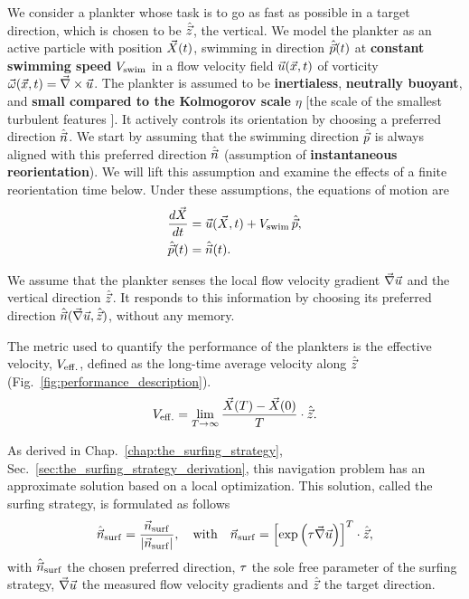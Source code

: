 We consider a plankter whose task is to go as fast as possible in a target direction, which is chosen to be $\hat{\vec{z}}$, the vertical.
We model the plankter as an active particle with position $\vec{X} (t)$, swimming in direction $\hat{\vec{p}}(t)$ at \textbf{constant swimming speed} $V_{\mathrm{swim}}$ in a flow velocity field $\vec{u} (\vec{x}, t)$ of vorticity $\vec{\omega} (\vec{x}, t) = \vec{\nabla} \times \vec{u}$.
The plankter is assumed to be \textbf{inertialess}, \textbf{neutrally buoyant}, and \textbf{small compared to the Kolmogorov scale} $\eta$ [the scale of the smallest turbulent features \citep{frisch1995turbulence}].
It actively controls its orientation by choosing a preferred direction $\hat{\vec{n}}$.
We start by assuming that the swimming direction $\hat{\vec{p}}$ is always aligned with this preferred direction $\hat{\vec{n}}$ (assumption of \textbf{instantaneous reorientation}).
We will lift this assumption and examine the effects of a finite reorientation time below.
Under these assumptions, the equations of motion are
\begin{subequations}\label{turb:eq:motion}
	\begin{align}
		\frac{d \vec{X}}{dt} & =
		 \vec{u} (\vec{X}, t) + V_{\mathrm{swim}} \, \hat{\vec{p}}, \label{turb:eq:x_motion}\\
		\hat{\vec{p}}(t) & = \hat{\vec{n}}(t) .\label{turb:eq:p_motion}
	\end{align}
\end{subequations}

We assume that the plankter senses the local flow velocity gradient $\vec{\nabla} \vec{u}$ and the vertical direction $\hat{\vec{z}}$.
It responds to this information by choosing its preferred direction $\hat{\vec{n}}(\vec{\nabla} \vec{u},\hat{\vec{z}})$, without any memory.

The metric used to quantify the performance of the plankters is the effective velocity, $V_{\mathrm{eff.}}$, defined as the long-time average velocity along $\hat{\vec{z}}$ (Fig.~\ref{fig:performance_description}).
\begin{equation}
	\label{turb:eq:performance}
	V_{\mathrm{eff.}} = \lim_{T\to\infty} \frac{\vec{X} (T) - \vec{X} (0)}{T} \cdot \hat{\vec{z}}.
\end{equation}

As derived in Chap.~\ref{chap:the_surfing_strategy}, Sec.~\ref{sec:the_surfing_strategy_derivation}, this navigation problem has an approximate solution based on a local optimization.
This solution, called the surfing strategy, is formulated as follows
\begin{equation}
	\label{turb:eq:surfing_swimming_direction_final}
	\hat{\vec{n}}_{\mathrm{surf}} = \frac{\vec{n}_{\mathrm{surf}}}{\lvert\vec{n}_{\mathrm{surf}}\rvert}, \quad \text{with} \quad \vec{n}_{\mathrm{surf}} = \left[ \exp \left( \tau \vec{\nabla} \vec{u} \right) \right]^T \cdot \hat{\vec{z}},
\end{equation}
with $\hat{\vec{n}}_{\mathrm{surf}}$ the chosen preferred direction, $\tau$ the sole free parameter of the surfing strategy, $\vec{\nabla} \vec{u}$ the measured flow velocity gradients and $\hat{\vec{z}}$ the target direction.

